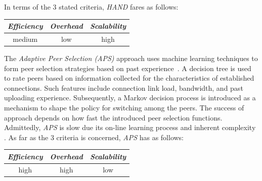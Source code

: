 In terms of the $3$ stated criteria, \emph{HAND} fares as follows:
\begin{center}
{\footnotesize
\begin{tabular}{ccc}
\emph{Efficiency} & \emph{Overhead} & \emph{Scalability} \\
\hline
medium &
low &
high
\end{tabular}
}
\end{center}

The \emph{Adaptive Peer Selection (APS)} approach uses 
machine learning techniques to form peer selection strategies based on past
experience~\cite{BFLZ2003}. A decision tree is used to rate peers based on
information collected for the characteristics of established connections. Such
features include connection link load, bandwidth, and past uploading experience.
Subsequently, a Markov decision process is introduced as a mechanism to shape
the policy for switching among the peers. The success of approach depends on
how fast the introduced peer selection functions. Admittedly, \emph{APS} is slow 
due its on-line learning process and inherent complexity \cite{ZZLZ2009}. As far
as the $3$ criteria is concerned, \emph{APS} has as follows:
\begin{center}
{\footnotesize
\begin{tabular}{ccc}
\emph{Efficiency} & \emph{Overhead} & \emph{Scalability} \\
\hline
high &
high &
low
\end{tabular}
}
\end{center}

